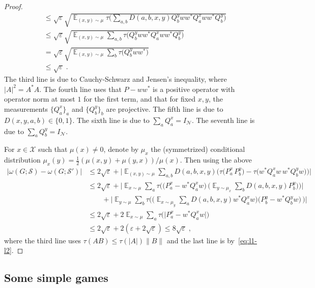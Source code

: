 \documentclass[11pt]{article}
\theoremstyle{definition}
\newcommand{\strategy}{\mathscr{S}}
\DeclareMathOperator*{\Expectation}{\mathbb{E}}
\newcommand{\Es}[1]{\Expectation_{#1}}
\newcommand{\mX}{\ensuremath{\mathcal{X}}}
\newcommand{\eps}{\varepsilon}
\newcommand{\mN}{\mathcal{N}}
\begin{document}
\begin{proof}
\begin{align*}
&\leq \sqrt{\eps}\sqrt{ \Es{(x,y)\sim\mu} \tau\big( \sum_{a,b} D(a,b,x,y)   Q^y_b ww^* Q^x_a w w^* Q^y_b \big) } \\
&\leq \sqrt{\eps}\sqrt{ \Es{(x,y)\sim\mu}  \sum_{a,b}  \tau\big(Q^y_b ww^* Q^x_a w w^* Q^y_b \big) }  \\
&=\sqrt{\eps}\sqrt{ \Es{(x,y)\sim\mu}  \sum_{b}  \tau\big(Q^y_b ww^* \big) } \\
&\leq \sqrt{\eps}\;.
\end{align*}
The third line is due to Cauchy-Schwarz and Jensen's inequality, where $|A|^2=A^*A$. The fourth line uses that $P - ww^*$ is a positive operator with operator norm at most $1$ for the first term, and that for fixed $x,y$, the measurements $\{ Q^x_a \}_a$ and $\{Q^y_b\}_b$ are projective. The fifth line is due to $D(x,y,a,b) \in \{0,1\}$. The sixth line is due to $\sum_a Q^x_a = I_\mN$. The seventh line is due to $\sum_a Q^y_b = I_\mN$.

For $x\in \mX$ such that $\mu(x)\neq 0$, denote by $\mu_x$ the (symmetrized) conditional distribution $\mu_x(y)=\frac{1}{2}(\mu(x,y)+\mu(y,x))/\mu(x)$. Then using the above
\begin{align*}
\big|\omega(G;\strategy) - \omega(G;\strategy')\big|
 &\leq 2\sqrt{\eps}+ \Big|\Es{(x,y)\sim\mu} \sum_{a,b} D(a,b,x,y) \big( \tau\big( P^x_a \, P^y_b \big)-\tau\big( w^* Q^x_a w\, w^* Q^y_b w\big)\big)\Big|\\
&\leq  2\sqrt{\eps}+ \Big|\Es{x\sim\mu} \sum_{a}  \tau\Big( \big(P^x_a-w^* Q^x_aw\big) \, \Big( \Es{y\sim \mu_x} \sum_b D(a,b,x,y) P^y_b \Big)\Big)\Big|\\
&\qquad+ \Big|\Es{y\sim\mu} \sum_{b}  \tau\Big(\Big( \Es{x\sim \mu_y} \sum_a D(a,b,x,y) w^* Q^x_a w\Big) \big(P^y_b-w^*Q^y_bw\big) \, \Big)\Big|\\
&\leq 2\sqrt{\eps}+2\Es{x\sim\mu} \sum_{a}  \tau\big(\big| P^x_a-w^*Q^x_aw\big|\big) \\
&\leq 2\sqrt{\eps}+2(\eps + 2\sqrt{\eps}) \leq 8\sqrt{\eps}\;,
\end{align*}
where the third line uses $\tau(AB)\leq\tau(|A|)\|B\|$ and the last line is by~\eqref{eq:l1-l2}.%
\end{proof}
	
\subsection{Some simple games}
\end{document}
